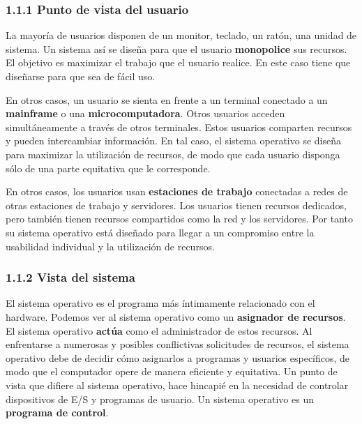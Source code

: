 \documentclass{article}
\begin{document}
\subsubsection*{1.1.1 Punto de vista del usuario}
La mayor\'{i}a de usuarios disponen de un monitor, teclado, un rat\'{o}n, una unidad de sistema.
Un sistema as\'{i} se dise\~{n}a para que el usuario \textbf{monopolice} sus recursos. El objetivo
es maximizar el trabajo que el usuario realice. En este caso tiene que dise\~{n}arse para que sea
de f\'{a}cil uso.

En otros casos, un usuario se sienta en frente a un terminal conectado a un \textbf{mainframe} o una
\textbf{microcomputadora}. Otros usuarios acceden simult\'{a}neamente a trav\'{e}s de otros terminales.
Estos usuarios comparten recursos y pueden intercambiar informaci\'{o}n. En tal caso, el sistema operativo
se dise\~{n}a para maximizar la utilizaci\'{o}n de recursos, de modo que cada usuario disponga s\'{o}lo de 
una parte equitativa que le corresponde.

En otros casos, los usuarios usan \textbf{estaciones de trabajo} conectadas a redes de otras estaciones de
trabajo y servidores. Los usuarios tienen recursos dedicados, pero tambi\'{e}n tienen recursos compartidos
como la red y los servidores. Por tanto su sistema operativo est\'{a} dise\~{n}ado para llegar a un compromiso
entre la usabilidad individual y la utilizaci\'{o}n de recursos.

\subsubsection*{1.1.2 Vista del sistema}
El sistema operativo es el programa m\'{a}s \'{i}ntimamente relacionado con el hardware. Podemos ver al sistema
operativo como un \textbf{asignador de recursos}. El sistema operativo \textbf{act\'{u}a} como el administrador
de estos recursos. Al enfrentarse a numerosas y posibles conflictivas solicitudes de recursos, el sistema operativo
debe de decidir c\'{o}mo asignarlos a programas y usuarios espec\'{i}ficos, de modo que el computador opere de manera
eficiente y equitativa.
Un punto de vista que difiere al sistema operativo, hace hincapi\'{e} en la necesidad de controlar dispositivos de 
E/S y programas de usuario. Un sistema operativo es un \textbf{programa de control}.
\end{document}
